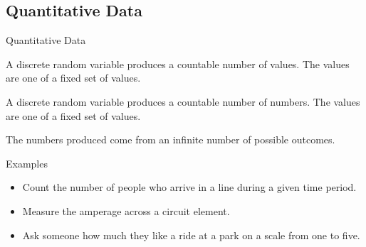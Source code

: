 \subsection{Quantitative Data}

\begin{frame}{Quantitative Data}

  \begin{definition}

    A discrete random variable produces a countable number of
    values. The values are one of a fixed set of values.
    
  \end{definition}
  
  \begin{definition}

    A discrete random variable produces a countable number of
    numbers. The values are one of a fixed set of values. 

  \end{definition}

  \begin{definition}

    The numbers produced come from an infinite number of possible
    outcomes.
    
  \end{definition}

\end{frame}

\begin{frame}{Examples}

  \begin{itemize}
  \item Count the number of people who arrive in a line during a given
    time period. 

  \item Measure the amperage across a circuit
    element. 

  \item Ask someone how much they like a ride at a park on a scale
    from one to five. 

  \end{itemize}
  
\end{frame}


